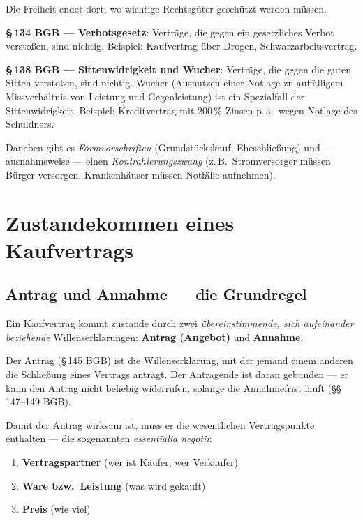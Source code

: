 \documentclass[11pt, a4paper]{article}
\begin{document}
Die Freiheit endet dort, wo wichtige Rechtsgüter geschützt werden müssen.

\textbf{§\,134 BGB --- Verbotsgesetz}: Verträge, die gegen ein gesetzliches Verbot
verstoßen, sind nichtig. Beispiel: Kaufvertrag über Drogen, Schwarzarbeitsvertrag.

\textbf{§\,138 BGB --- Sittenwidrigkeit und Wucher}: Verträge, die gegen die guten
Sitten verstoßen, sind nichtig. Wucher (Ausnutzen einer Notlage zu auffälligem
Missverhältnis von Leistung und Gegenleistung) ist ein Spezialfall der Sittenwidrigkeit.
Beispiel: Kreditvertrag mit 200\,\% Zinsen p.\,a.\ wegen Notlage des Schuldners.

Daneben gibt es \emph{Form­vorschriften} (Grundstücks­kauf, Eheschließung) und ---
ausnahmsweise --- einen \emph{Kontrahierungs­zwang} (z.\,B.\ Strom­versorger müssen
Bürger versorgen, Krankenhäuser müssen Notfälle aufnehmen).

\section{Zustandekommen eines Kaufvertrags}

\subsection{Antrag und Annahme --- die Grundregel}

\begin{merksatz}
Ein Kaufvertrag kommt zustande durch zwei \emph{übereinstimmende, sich aufeinander
beziehende} Willenserklärungen: \textbf{Antrag (Angebot)} und \textbf{Annahme}.
\end{merksatz}

Der Antrag (\S\,145 BGB) ist die Willenserklärung, mit der jemand einem anderen die
Schließung eines Vertrags anträgt. Der Antragende ist daran gebunden --- er kann den
Antrag nicht beliebig widerrufen, solange die Annahmefrist läuft (§§\,147--149 BGB).

Damit der Antrag wirksam ist, muss er die wesentlichen Vertragspunkte enthalten ---
die sogenannten \emph{essentialia negotii}:

\begin{enumerate}
  \item \textbf{Vertragspartner} (wer ist Käufer, wer Verkäufer)
  \item \textbf{Ware bzw.\ Leistung} (was wird gekauft)
  \item \textbf{Preis} (wie viel)
\end{enumerate}
\end{document}
